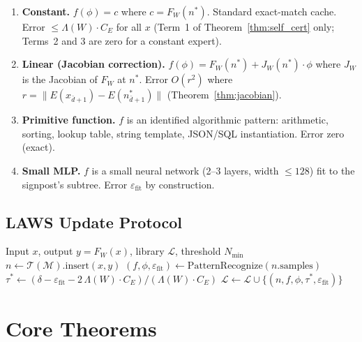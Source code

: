 \documentclass[11pt]{article}
\begin{document}
\begin{enumerate}[leftmargin=2em,label=\textbf{Level \arabic*.}]
  \item \textbf{Constant.} $f(\phi) = c$ where $c = F_W(n^*)$.  Standard exact-match cache.
        Error $\leq \Lambda(W)\cdot C_E$ for all $x$ (Term~1 of
        Theorem~\ref{thm:self_cert} only; Terms~2 and 3 are zero for a constant expert).
  \item \textbf{Linear (Jacobian correction).}
        $f(\phi) = F_W(n^*) + J_W(n^*) \cdot \phi$ where $J_W$ is the
        Jacobian of $F_W$ at $n^*$.  Error $O(r^2)$ where $r = \|E(x_{\bar{d}+1})-E(n^*_{\bar{d}+1})\|$
        (Theorem~\ref{thm:jacobian}).
  \item \textbf{Primitive function.}  $f$ is an identified algorithmic
        pattern: arithmetic, sorting, lookup table, string template,
        JSON/SQL instantiation.  Error zero (exact).
  \item \textbf{Small MLP.}  $f$ is a small neural network (2--3 layers,
        width $\leq 128$) fit to the signpost's subtree.
        Error $\varepsilon_{\mathrm{fit}}$ by construction.
\end{enumerate}

\subsection{LAWS Update Protocol}

\begin{algorithm}[t]
\caption{LAWS Update}
\label{alg:laws_update}
\begin{algorithmic}[1]
\Require Input $x$, output $y = F_W(x)$, library $\mathcal{L}$, threshold $N_{\min}$
\State $n \gets \mathcal{T}(\mathcal{M}).\text{insert}(x, y)$
  \State $(f, \phi, \varepsilon_{\mathrm{fit}}) \gets \mathrm{PatternRecognize}(n.\text{samples})$
  \State $\tau^* \gets (\delta - \varepsilon_{\mathrm{fit}} - 2\,\Lambda(W) \cdot C_E) / (\Lambda(W) \cdot C_E)$
  \State $\mathcal{L} \gets \mathcal{L} \cup \{(n, f, \phi, \tau^*, \varepsilon_{\mathrm{fit}})\}$
\EndIf
\end{algorithmic}
\end{algorithm}

\section{Core Theorems}
\label{sec:theorems}
\end{document}
